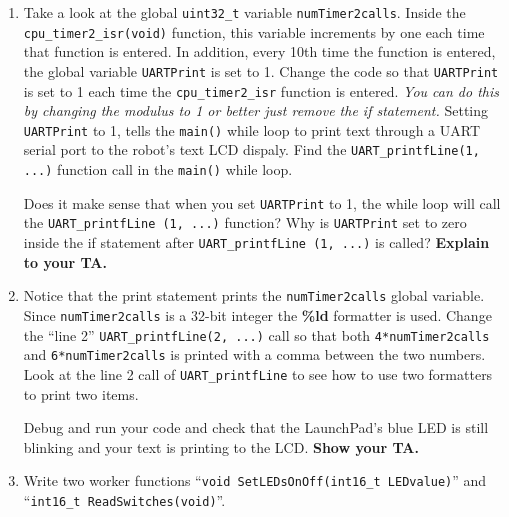 \documentclass[11pt]{article}
\begin{document}
\begin{enumerate}
        \begin{checkoff}
                Knowing that a 32 bit unsigned integer has a maximum value, what is the largest period in seconds that the CPU Timers can be set to? \textbf{Explain your answer to your TA.}
        \end{checkoff}
        \item Take a look at the global \texttt{uint32_t} variable \texttt{numTimer2calls}. Inside the \texttt{cpu_timer2_isr(void)} function, this variable increments by one each time that function is entered. In addition, every 10th time the function is entered, the global variable \texttt{UARTPrint} is set to 1. Change the code so that \texttt{UARTPrint} is set to 1 each time the \texttt{cpu_timer2_isr} function is entered. \textit{You can do this by changing the modulus to 1 or better just remove the if statement.} Setting \texttt{UARTPrint} to 1, tells the \texttt{main()} while loop to print text through a UART serial port to the robot’s text LCD dispaly. Find the \texttt{UART_printfLine(1, ...)} function call in the \texttt{main()} while loop.
        \begin{checkoff}
                Does it make sense that when you set \texttt{UARTPrint} to 1, the while loop will call the \texttt{UART_printfLine (1, ...)} function? Why is \texttt{UARTPrint} set to zero inside the if statement after \texttt{UART_printfLine (1, ...)} is called? \textbf{Explain to your TA.}
        \end{checkoff}
        \item Notice that the print statement prints the \texttt{numTimer2calls} global variable. Since \texttt{numTimer2calls} is a 32-bit integer the \textbf{\%ld} formatter is used. Change the “line 2” \texttt{UART_printfLine(2, ...)} call so that both \texttt{4*numTimer2calls} and \texttt{6*numTimer2calls} is printed with a comma between the two numbers. Look at the line 2 call of \texttt{UART_printfLine} to see how to use two formatters to print two items.
        \begin{checkoff}
                Debug and run your code and check that the LaunchPad’s blue LED is still blinking and your text is printing to the LCD. \textbf{Show your TA.}
        \end{checkoff}
        \item Write two worker functions “\texttt{void SetLEDsOnOff(int16_t LEDvalue)}” and “\texttt{int16_t ReadSwitches(void)}”.

\end{enumerate}
\end{document}
